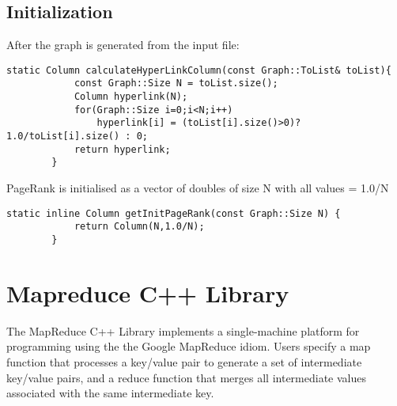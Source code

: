 \documentclass{article}
\newcommand{\cpp}{\lstinline[language=C++]}
\begin{document}
    \subsection{Initialization}
    After the graph is generated from the input file:
    \begin{lstlisting}[caption={ Calculating Hyperlink}] 
        static Column calculateHyperLinkColumn(const Graph::ToList& toList){
            const Graph::Size N = toList.size();
            Column hyperlink(N);
            for(Graph::Size i=0;i<N;i++)
                hyperlink[i] = (toList[i].size()>0)? 1.0/toList[i].size() : 0;
            return hyperlink;
        }
    \end{lstlisting}
    PageRank is initialised as a vector of doubles of size N with all values = 1.0/N
    \begin{lstlisting}[caption={ Initialising PageRank}] 
        static inline Column getInitPageRank(const Graph::Size N) {
            return Column(N,1.0/N);
        }
    \end{lstlisting}
 
    
    
    \clearpage
    \section{Mapreduce C++ Library}
    The MapReduce C++ Library implements a single-machine platform for programming using the the Google MapReduce idiom. Users specify a map function that processes a key/value pair to generate a set of intermediate key/value pairs, and a reduce function that merges all intermediate values associated with the same intermediate key. 
    
\end{document}
